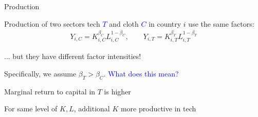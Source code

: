 \documentclass[notes,11pt, aspectratio=169, xcolor=table]{beamer}
\newcommand{\blue}[1]{\textcolor{blue}{#1}}
\newenvironment{wideitemize}{\itemize\addtolength{\itemsep}{10pt}}{\enditemize}
\begin{document}
\begin{frame}{Production}

    \begin{wideitemize}

        \item<1-> Production of two sectors tech \blue{$T$} and cloth \blue{$C$} in country $i$ use the same factors:
        \begin{eqnarray*}\label{eq: production}
         Y_{i,C} = K_{i,C}^{\beta_C} L_{i,C}^{1-\beta_C}, \qquad  Y_{i,T} = K_{i,T}^{\beta_T} L_{i,T}^{1-\beta_T}
        \end{eqnarray*}

        \item<2-> ... but they have different factor intensities!
        \item<3-> Specifically, we assume $\beta_T > \beta_C$. \blue{What does this mean?}
        \item<4-> Marginal return to capital in $T$ is higher
        \item<5-> For same level of $K,L$, additional $K$ more productive in tech
    \end{wideitemize}
\end{frame}
\end{document}
